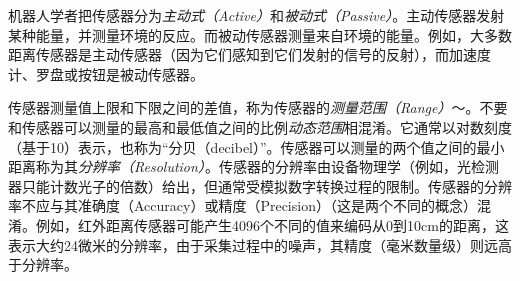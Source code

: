 
机器人学者把传感器分为\emph{主动式（Active）}和\emph{被动式（Passive）}。主动传感器发射某种能量，并测量环境的反应。而被动传感器测量来自环境的能量。例如，大多数距离传感器是主动传感器（因为它们感知到它们发射的信号的反射），而加速度计、罗盘或按钮是被动传感器。


传感器测量值上限和下限之间的差值，称为传感器的\emph{测量范围（Range）}〜。不要和传感器可以测量的最高和最低值之间的比例\emph{动态范围}相混淆。它通常以对数刻度（基于10）表示，也称为“分贝（decibel）”。传感器可以测量的两个值之间的最小距离称为其\emph{分辨率（Resolution）}。传感器的分辨率由设备物理学（例如，光检测器只能计数光子的倍数）给出，但通常受模拟数字转换过程的限制。传感器的分辨率不应与其准确度（Accuracy）或精度（Precision）（这是两个不同的概念）混淆。例如，红外距离传感器可能产生4096个不同的值来编码从0到10cm的距离，这表示大约24微米的分辨率，由于采集过程中的噪声，其精度（毫米数量级）则远高于分辨率。



